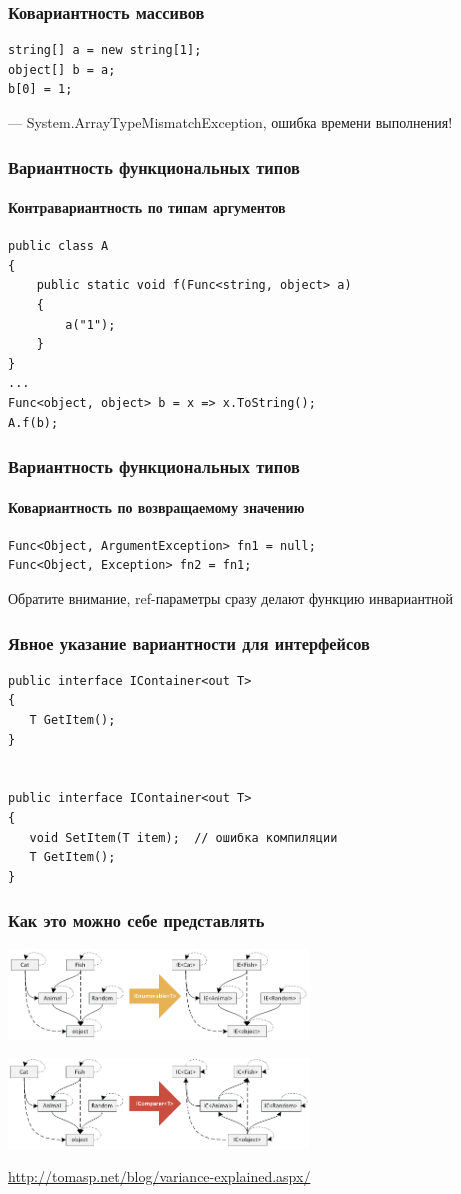 \documentclass[xetex,mathserif,serif]{beamer}
\begin{document}
	\begin{frame}[fragile]
		\frametitle{Ковариантность массивов}
		\begin{verbatim}
string[] a = new string[1];
object[] b = a;
b[0] = 1;
		\end{verbatim}
		--- System.ArrayTypeMismatchException, ошибка времени выполнения!
	\end{frame}

	\begin{frame}[fragile]
		\frametitle{Вариантность функциональных типов}
		\framesubtitle{Контравариантность по типам аргументов}
		\begin{verbatim}
public class A
{
    public static void f(Func<string, object> a)
    {
        a("1");
    }
}
...
Func<object, object> b = x => x.ToString();
A.f(b);
		\end{verbatim}
	\end{frame}

	\begin{frame}[fragile]
		\frametitle{Вариантность функциональных типов}
		\framesubtitle{Ковариантность по возвращаемому значению}
		\begin{verbatim}
Func<Object, ArgumentException> fn1 = null;
Func<Object, Exception> fn2 = fn1;
		\end{verbatim}

		Обратите внимание, ref-параметры сразу делают функцию инвариантной
	\end{frame}

	\begin{frame}[fragile]
		\frametitle{Явное указание вариантности для интерфейсов}
		\begin{verbatim}
public interface IContainer<out T>
{
   T GetItem();
}


public interface IContainer<out T>
{
   void SetItem(T item);  // ошибка компиляции
   T GetItem();
}
		\end{verbatim}
	\end{frame}

	\begin{frame}
		\frametitle{Как это можно себе представлять}
		\begin{center}
			\includegraphics[width=0.6\textwidth]{covariantFunctors.png}

			\vspace{4mm}
			\includegraphics[width=0.6\textwidth]{contravariantFunctors.png}
		\end{center}
			
		\url{http://tomasp.net/blog/variance-explained.aspx/}
	\end{frame}
\end{document}
